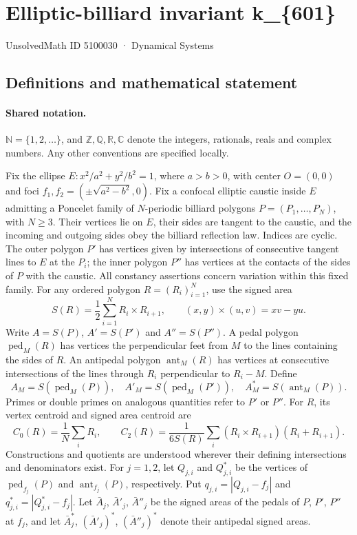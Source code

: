 \documentclass[11pt]{article}
\begin{document}
\setcounter{section}{5100029}
\section{Elliptic-billiard invariant k\_\{601\}}\label{5100030}
{\small\sffamily UnsolvedMath ID 5100030 · Dynamical Systems}
\subsection{Definitions and mathematical statement}

\paragraph{Shared notation.}$\mathbb N=\{1,2,\ldots\}$, and $\mathbb Z,\mathbb Q,\mathbb R,\mathbb C$ denote the integers, rationals, reals and complex numbers. Any other conventions are specified locally.


Fix the ellipse $E:x^2/a^2+y^2/b^2=1$, where $a>b>0$, with center $O=(0,0)$ and foci $f_1,f_2=(\pm\sqrt{a^2-b^2},0)$. Fix a confocal elliptic caustic inside $E$ admitting a Poncelet family of $N$-periodic billiard polygons $P=(P_1,\ldots,P_N)$, with $N\geq3$. Their vertices lie on $E$, their sides are tangent to the caustic, and the incoming and outgoing sides obey the billiard reflection law. Indices are cyclic. The outer polygon $P'$ has vertices given by intersections of consecutive tangent lines to $E$ at the $P_i$; the inner polygon $P''$ has vertices at the contacts of the sides of $P$ with the caustic. All constancy assertions concern variation within this fixed family.
For any ordered polygon $R=(R_i)_{i=1}^N$, use the signed area
\[S(R)=\frac12\sum_{i=1}^N R_i\times R_{i+1},\qquad (x,y)\times(u,v)=xv-yu.\]
Write $A=S(P)$, $A'=S(P')$ and $A''=S(P'')$. A pedal polygon $\operatorname{ped}_M(R)$ has vertices the perpendicular feet from $M$ to the lines containing the sides of $R$. An antipedal polygon $\operatorname{ant}_M(R)$ has vertices at consecutive intersections of the lines through $R_i$ perpendicular to $R_i-M$. Define
\[A_M=S(\operatorname{ped}_M(P)),\quad A'_M=S(\operatorname{ped}_M(P')),\quad A_M^*=S(\operatorname{ant}_M(P)).\]
Primes or double primes on analogous quantities refer to $P'$ or $P''$. For $R$, its vertex centroid and signed area centroid are
\[C_0(R)=\frac1N\sum_i R_i,\qquad C_2(R)=\frac{1}{6S(R)}\sum_i(R_i\times R_{i+1})(R_i+R_{i+1}).\]
Constructions and quotients are understood wherever their defining intersections and denominators exist.
For $j=1,2$, let $Q_{j,i}$ and $Q^*_{j,i}$ be the vertices of $\operatorname{ped}_{f_j}(P)$ and $\operatorname{ant}_{f_j}(P)$, respectively. Put $q_{j,i}=|Q_{j,i}-f_j|$ and $q^*_{j,i}=|Q^*_{j,i}-f_j|$. Let $\bar A_j$, $\bar A'_j$, $\bar A''_j$ be the signed areas of the pedals of $P$, $P'$, $P''$ at $f_j$, and let $\bar A_j^*$, $(\bar A'_j)^*$, $(\bar A''_j)^*$ denote their antipedal signed areas.
\end{document}

